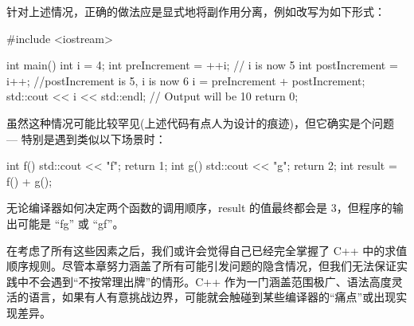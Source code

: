 针对上述情况，正确的做法应是显式地将副作用分离，例如改写为如下形式：

\begin{cpp}
#include <iostream>

int main() {
  int i = 4;
  int preIncrement = ++i; // i is now 5
  int postIncrement = i++; //postIncrement is 5, i is now 6
  i = preIncrement + postIncrement;
  std::cout << i << std::endl; // Output will be 10
  return 0;
}
\end{cpp}

虽然这种情况可能比较罕见(上述代码有点人为设计的痕迹)，但它确实是个问题 --- 特别是遇到类似以下场景时：

\begin{cpp}
int f() { std::cout << "f"; return 1; }
int g() { std::cout << "g"; return 2; }
int result = f() + g();
\end{cpp}

无论编译器如何决定两个函数的调用顺序，result 的值最终都会是 3，但程序的输出可能是 “fg” 或 “gf”。

在考虑了所有这些因素之后，我们或许会觉得自己已经完全掌握了 C++ 中的求值顺序规则。尽管本章努力涵盖了所有可能引发问题的隐含情况，但我们无法保证实践中不会遇到“不按常理出牌”的情形。C++ 作为一门涵盖范围极广、语法高度灵活的语言，如果有人有意挑战边界，可能就会触碰到某些编译器的“痛点”或出现实现差异。
